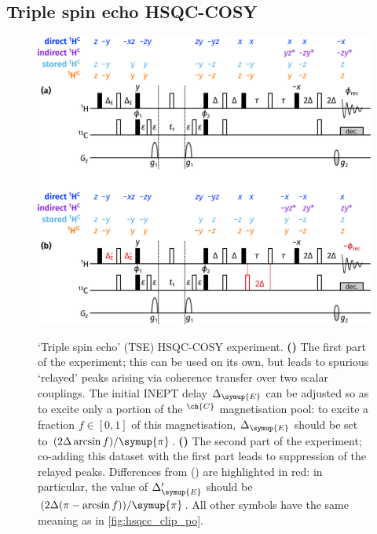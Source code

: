 \documentclass[a4paper,12pt]{article}
\newcommand{\DeltaE}{\Delta_{\symup{E}}}
\newcommand{\magn}[1]{\ch{^1H}$^{\ch{#1}}$}
\newcommand{\magnnot}[1]{\ch{^1H}$^{!\ch{#1}}$}
\newcommand{\cpi}{\symup{\pi}}
\begin{document}
\begin{refsection}

\section{Triple spin echo HSQC-COSY}

\begin{figure}[!ht]
    \centering
    \includegraphics[]{tse_po.png}%
    {\label{fig:hsqcc_tse_po_1}}%
    {\label{fig:hsqcc_tse_po_2}}%
    \caption[Triple spin echo HSQC-COSY experiment]{
        `Triple spin echo' (TSE) HSQC-COSY experiment.
        \textbf{()} The first part of the experiment; this can be used on its own, but leads to spurious `relayed' peaks arising via coherence transfer over two scalar couplings.
        The initial INEPT delay $\DeltaE$ can be adjusted so as to excite only a portion of the \magn{C} magnetisation pool: to excite a fraction $f \in [0, 1]$ of this magnetisation, $\DeltaE$ should be set to $(2\Delta \arcsin f)/\cpi$.
        \textbf{()} The second part of the experiment; co-adding this dataset with the first part leads to suppression of the relayed peaks.
        Differences from () are highlighted in red: in particular, the value of $\DeltaE'$ should be $(2\Delta (\pi - \arcsin f))/\cpi$.
        All other symbols have the same meaning as in \cref{fig:hsqcc_clip_po}.
    }
    \label{fig:hsqcc_tse_po}
\end{figure}


\end{refsection}
\end{document}
